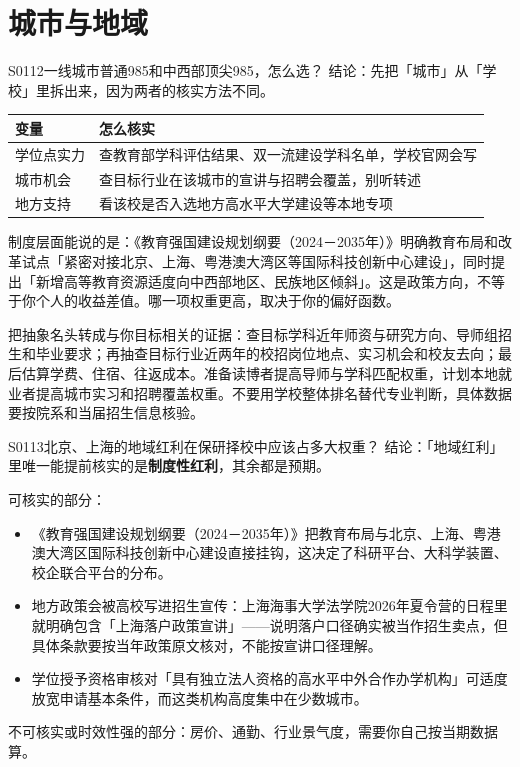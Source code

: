 \section{城市与地域}
\begin{qa}{S0112}{一线城市普通985和中西部顶尖985，怎么选？}
结论：先把「城市」从「学校」里拆出来，因为两者的核实方法不同。

\par\vspace{2pt}\nobreak\begin{center}\footnotesize
\begin{tabularx}{\textwidth}{>{\raggedright\arraybackslash}X>{\raggedright\arraybackslash}X}
\toprule
\textbf{变量} & \textbf{怎么核实} \\ \midrule
学位点实力 & 查教育部学科评估结果、双一流建设学科名单，学校官网会写 \\
城市机会 & 查目标行业在该城市的宣讲与招聘会覆盖，别听转述 \\
地方支持 & 看该校是否入选地方高水平大学建设等本地专项 \\
\bottomrule
\end{tabularx}
\end{center}\vspace{2pt}\par

制度层面能说的是：《教育强国建设规划纲要（2024－2035年）》明确教育布局和改革试点「紧密对接北京、上海、粤港澳大湾区等国际科技创新中心建设」，同时提出「新增高等教育资源适度向中西部地区、民族地区倾斜」。这是政策方向，不等于你个人的收益差值。哪一项权重更高，取决于你的偏好函数。

把抽象名头转成与你目标相关的证据：查目标学科近年师资与研究方向、导师组招生和毕业要求；再抽查目标行业近两年的校招岗位地点、实习机会和校友去向；最后估算学费、住宿、往返成本。准备读博者提高导师与学科匹配权重，计划本地就业者提高城市实习和招聘覆盖权重。不要用学校整体排名替代专业判断，具体数据要按院系和当届招生信息核验。
\end{qa}

\begin{qa}{S0113}{北京、上海的地域红利在保研择校中应该占多大权重？}
结论：「地域红利」里唯一能提前核实的是\textbf{制度性红利}，其余都是预期。

可核实的部分：
\begin{itemize}
  \item 《教育强国建设规划纲要（2024－2035年）》把教育布局与北京、上海、粤港澳大湾区国际科技创新中心建设直接挂钩，这决定了科研平台、大科学装置、校企联合平台的分布。
  \item 地方政策会被高校写进招生宣传：上海海事大学法学院2026年夏令营的日程里就明确包含「上海落户政策宣讲」——说明落户口径确实被当作招生卖点，但具体条款要按当年政策原文核对，不能按宣讲口径理解。
  \item 学位授予资格审核对「具有独立法人资格的高水平中外合作办学机构」可适度放宽申请基本条件，而这类机构高度集中在少数城市。
\end{itemize}

不可核实或时效性强的部分：房价、通勤、行业景气度，需要你自己按当期数据算。
\end{qa}

